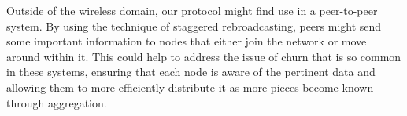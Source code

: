 \documentclass{IEEEtran}
\begin{document}
Outside of the wireless domain, our protocol might find use in a peer-to-peer system.
By using the technique of staggered rebroadcasting, peers might send some important information to nodes that either join the network or move around within it.
This could help to address the issue of churn that is so common in these systems, ensuring that each node is aware of the pertinent data and allowing them to more efficiently distribute it as more pieces become known through aggregation.




\end{document}
